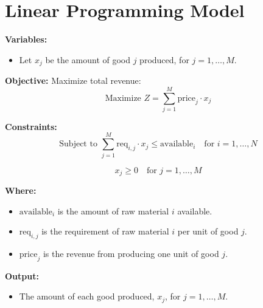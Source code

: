 \documentclass{article}
\begin{document}
\section*{Linear Programming Model}

\textbf{Variables:}
\begin{itemize}
    \item Let \( x_j \) be the amount of good \( j \) produced, for \( j = 1, \ldots, M \).
\end{itemize}

\textbf{Objective:} 
Maximize total revenue:
\[
\text{Maximize } Z = \sum_{j=1}^{M} \text{price}_j \cdot x_j
\]

\textbf{Constraints:}
\[
\text{Subject to } \sum_{j=1}^{M} \text{req}_{i,j} \cdot x_j \leq \text{available}_i \quad \text{for } i = 1, \ldots, N
\]

\[
x_j \geq 0 \quad \text{for } j = 1, \ldots, M
\]

\textbf{Where:}
\begin{itemize}
    \item \( \text{available}_i \) is the amount of raw material \( i \) available.
    \item \( \text{req}_{i,j} \) is the requirement of raw material \( i \) per unit of good \( j \).
    \item \( \text{price}_j \) is the revenue from producing one unit of good \( j \).
\end{itemize}

\textbf{Output:}
\begin{itemize}
    \item The amount of each good produced, \( x_j \), for \( j = 1, \ldots, M \).
\end{itemize}
\end{document}
